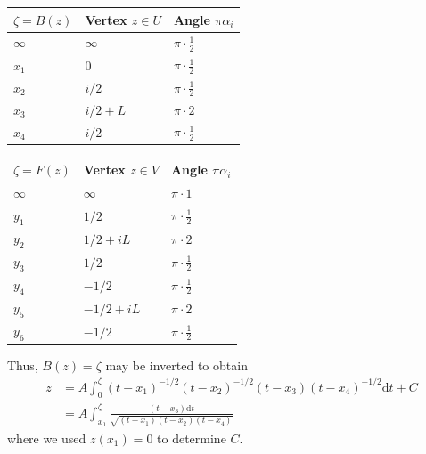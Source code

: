 \documentclass[10pt]{article}
\newcommand{\dif}{\mathrm{d}}
\theoremstyle{plain}
\theoremstyle{definition}
\theoremstyle{plain}
\begin{document}
\begin{table}[h]
\begin{center}
	\begin{tabular}{|l|l|l|}
		\hline
		$\zeta=B(z)$ & Vertex $z\in U$ & Angle $\pi\alpha_i$ \\
		\hline
		$\infty$ & $\infty$ & $\pi\cdot \frac{1}{2}$ \\
		$x_1$ & $0$ & $\pi\cdot \frac{1}{2}$ \\
		$x_2$ & $i/2$ & $\pi\cdot \frac{1}{2}$ \\
		$x_3$ & $i/2+L$ & $\pi \cdot 2$\\
		$x_4$ & $i/2$ & $\pi\cdot\frac{1}{2}$\\
		\hline
	\end{tabular}\quad		\begin{tabular}{|l|l|l|}
		\hline
		$\zeta=F(z)$ & Vertex $z\in V$ & Angle $\pi\alpha_i$ \\
		\hline
		$\infty$ & $\infty$ & $\pi\cdot 1$ \\
		$y_1$ & $1/2$ & $\pi\cdot \frac{1}{2}$ \\
		$y_2$ & $1/2+iL$ & $\pi\cdot 2$ \\
		$y_3$ & $1/2$ & $\pi \cdot \frac{1}{2}$\\
		$y_4$ & $-1/2$ & $\pi\cdot\frac{1}{2}$\\
		$y_5$ & $-1/2+iL$ & $\pi\cdot 2$\\
		$y_6$ & $-1/2$ & $\pi\cdot\frac{1}{2}$\\
		\hline
	\end{tabular}
\end{center}
\end{table}


Thus, $B(z)=\zeta$ may be inverted to obtain
\begin{align}
	z &= A\int_0^\zeta (t-x_1)^{-1/2}(t-x_2)^{-1/2}(t-x_3)(t-x_4)^{-1/2} \dif t + C \nonumber \\
	&= A\int_{x_1}^\zeta \frac{(t-x_3)\dif t}{\sqrt{(t-x_1)(t-x_2)(t-x_4)}} \label{scintegral}
\end{align}
where we used $z(x_1)=0$ to determine $C$. \\
\end{document}
